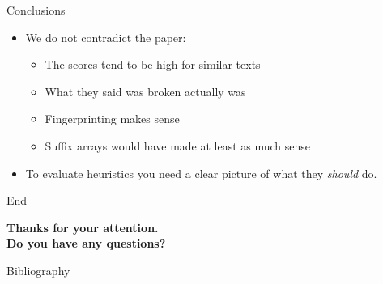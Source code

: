\documentclass[simple]{mybeamer}
\begin{document}
\begin{frame}{Conclusions}
  \begin{itemize}
    \item We do not contradict the paper:
    \begin{itemize}
        \item The scores tend to be high for similar texts
        \item What they said was broken actually was
        \item Fingerprinting makes sense
        \item Suffix arrays would have made at least as much sense
    \end{itemize}
    \item To evaluate heuristics you need a clear picture of what they \emph{should} do.
  \end{itemize}
\end{frame}

\begin{frame}{End}
    \vfill
    
    \begin{center}\textbf{
    Thanks for your attention.\\
    Do you have any questions?
    }\end{center}
    
    \vfill
\end{frame}

\begin{frame}{Bibliography}
\printbibliography
\end{frame}
\end{document}
